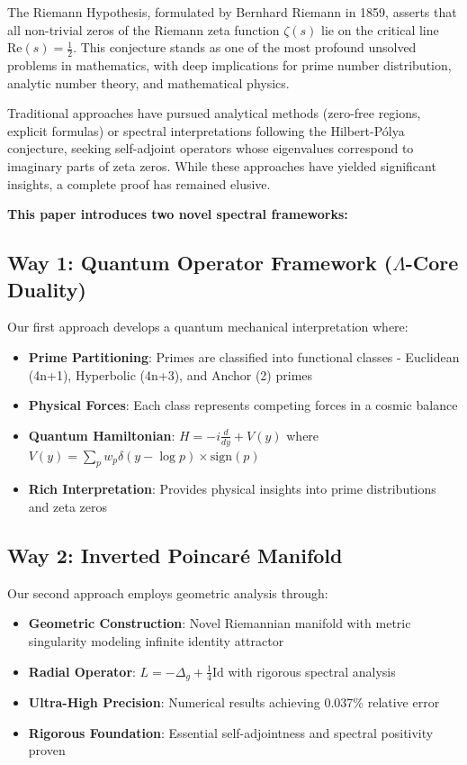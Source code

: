 \documentclass[12pt]{article}
\begin{document}
The Riemann Hypothesis, formulated by Bernhard Riemann in 1859, asserts that all non-trivial zeros of the Riemann zeta function $\zeta(s)$ lie on the critical line $\text{Re}(s) = \frac{1}{2}$. This conjecture stands as one of the most profound unsolved problems in mathematics, with deep implications for prime number distribution, analytic number theory, and mathematical physics.

Traditional approaches have pursued analytical methods (zero-free regions, explicit formulas) or spectral interpretations following the Hilbert-Pólya conjecture, seeking self-adjoint operators whose eigenvalues correspond to imaginary parts of zeta zeros. While these approaches have yielded significant insights, a complete proof has remained elusive.

\textbf{This paper introduces two novel spectral frameworks:}

\subsection{Way 1: Quantum Operator Framework ($\Lambda$-Core Duality)}

Our first approach develops a quantum mechanical interpretation where:
\begin{itemize}
\item \textbf{Prime Partitioning}: Primes are classified into functional classes - Euclidean (4n+1), Hyperbolic (4n+3), and Anchor (2) primes
\item \textbf{Physical Forces}: Each class represents competing forces in a cosmic balance
\item \textbf{Quantum Hamiltonian}: $H = -i\frac{d}{dy} + V(y)$ where $V(y) = \sum_p w_p \delta(y - \log p) \times \text{sign}(p)$
\item \textbf{Rich Interpretation}: Provides physical insights into prime distributions and zeta zeros
\end{itemize}

\subsection{Way 2: Inverted Poincaré Manifold}

Our second approach employs geometric analysis through:
\begin{itemize}
\item \textbf{Geometric Construction}: Novel Riemannian manifold with metric singularity modeling infinite identity attractor
\item \textbf{Radial Operator}: $L = -\Delta_g + \frac{1}{4}\text{Id}$ with rigorous spectral analysis
\item \textbf{Ultra-High Precision}: Numerical results achieving 0.037\% relative error
\item \textbf{Rigorous Foundation}: Essential self-adjointness and spectral positivity proven
\end{itemize}
\end{document}
